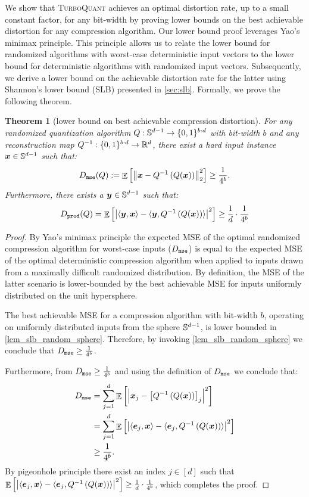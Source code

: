 \documentclass[11pt]{article}
\newtheorem{theorem}{Theorem}
\newcommand{\TurboQuant}{\textsc{TurboQuant}\xspace}
\begin{document}
We show that \TurboQuant achieves an optimal distortion rate, up to a small constant factor, for any bit-width by proving lower bounds on the best achievable distortion for any compression algorithm. 
Our lower bound proof leverages Yao's minimax principle. 
This principle allows us to relate the lower bound for randomized algorithms with worst-case deterministic input vectors to the lower bound for deterministic algorithms with randomized input vectors. 
Subsequently, we derive a lower bound on the achievable distortion rate for the latter using Shannon's lower bound (SLB) presented in \cref{sec:slb}.
Formally, we prove the following theorem.

\begin{theorem}[lower bound on best achievable compression distortion]
\label{thrm_lower_bound}
For any randomized quantization algorithm $Q: \mathbb{S}^{d-1} \to \{ 0, 1 \}^{b \cdot d}$ with bit-width $b$ and any reconstruction map $Q^{-1}: \{ 0, 1 \}^{b \cdot d} \to \mathbb{R}^d$, there exist a hard input instance ${\bm x} \in \mathbb{S}^{d-1}$ such that:
\[
D_{\tt mse}(Q) := \mathop{{\mathbb{E}}}\left[\left\| {\bm x} - Q^{-1}\left( Q({\bm x}) \right) \right\|_2^2 \right] \ge \frac{1}{4^{b}}.
\]
Furthermore, there exists a ${\bm y} \in \mathbb{S}^{d-1}$ such that:
\[
D_{\tt prod}(Q) = \mathop{{\mathbb{E}}}\left[\left| \langle {\bm y}, {\bm x} \rangle - \langle {\bm y}, Q^{-1}\left( Q({\bm x}) \right) \rangle \right|^2 \right] \ge \frac{1}{d} \cdot \frac{1}{4^{b}}
\]
\end{theorem}
\begin{proof}
By Yao's minimax principle the expected MSE of the optimal randomized compression algorithm for worst-case inputs ($D_{\tt mse}$) is equal to the expected MSE of the optimal deterministic compression algorithm when applied to inputs drawn from a maximally difficult randomized distribution. 
By definition, the MSE of the latter scenario is lower-bounded by the best achievable MSE for inputs uniformly distributed on the unit hypersphere.

The best achievable MSE for a compression algorithm with bit-width $b$, operating on uniformly distributed inputs from the sphere $\mathbb{S}^{d-1}$, is lower bounded in \cref{lem_slb_random_sphere}.
Therefore, by invoking \cref{lem_slb_random_sphere} we conclude that $D_{\tt mse} \ge \frac{1}{4^b}$.

Furthermore, from $D_{\tt mse} \ge \frac{1}{4^b}$ and using the definition of $D_{\tt mse}$ we conclude that:
\begin{align*}
    D_{\tt mse} &= \sum_{j=1}^d \mathop{{\mathbb{E}}} \left[\left| {\bm x}_j - \left[ Q^{-1}\left( Q({\bm x}) \right) \right]_j \right|^2 \right]\\
    &= \sum_{j=1}^d \mathop{{\mathbb{E}}} \left[\left| \langle {\bm e}_j, {\bm x} \rangle - \langle {\bm e}_j, Q^{-1}\left( Q({\bm x}) \right) \rangle \right|^2 \right]\\
    &\ge \frac{1}{4^b}.
\end{align*}
By pigeonhole principle there exist an index $j \in [d]$ such that $\mathop{{\mathbb{E}}} \left[\left| \langle {\bm e}_j, {\bm x} \rangle - \langle {\bm e}_j, Q^{-1}\left( Q({\bm x}) \right) \rangle \right|^2 \right] \ge \frac{1}{d} \cdot \frac{1}{4^b}$, which completes the proof.
\end{proof}
\end{document}
